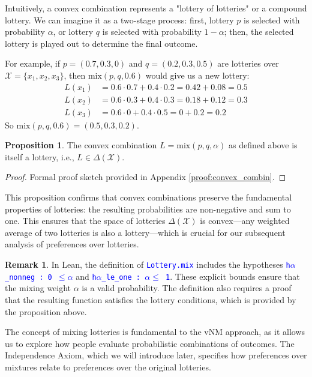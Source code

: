\documentclass{article}
\theoremstyle{definition}
\newtheorem{proposition}[definition]{Proposition}
\newtheorem{remark}{Remark}[section]
\newcommand{\X}{\mathcal{X}}
\newcommand{\tactic}[1]{\textcolor{blue}{\texttt{#1}}}
\newcommand{\DeltaX}{\Delta(\X)} %
\newcommand{\mix}{\mathrm{mix}} %
\begin{document}
Intuitively, a convex combination represents a "lottery of lotteries" or a compound lottery. We can imagine it as a two-stage process: first, lottery $p$ is selected with probability $\alpha$, or lottery $q$ is selected with probability $1-\alpha$; then, the selected lottery is played out to determine the final outcome.

For example, if $p=(0.7,0.3,0)$ and $q=(0.2,0.3,0.5)$ are lotteries over $\X=\{x_1,x_2,x_3\}$, then $\mix(p,q,0.6)$ would give us a new lottery:
\begin{align*}
L(x_1) &= 0.6 \cdot 0.7 + 0.4 \cdot 0.2 = 0.42 + 0.08 = 0.5\\ L(x_2) &= 0.6 \cdot 0.3 + 0.4 \cdot 0.3 = 0.18 + 0.12 = 0.3\\ L(x_3) &= 0.6 \cdot 0 + 0.4 \cdot 0.5 = 0 + 0.2 = 0.2
\end{align*}
So $\mix(p,q,0.6)=(0.5,0.3,0.2)$.

\begin{proposition}\label{convex_combin}
The convex combination $L = \mix(p, q, \alpha)$ as defined above is itself a lottery, i.e., $L \in \DeltaX$.
\end{proposition}
\begin{proof}
Formal proof sketch provided in Appendix \ref{proof:convex_combin}.
\end{proof}

This proposition confirms that convex combinations preserve the fundamental properties of lotteries: the resulting probabilities are non-negative and sum to one. This ensures that the space of lotteries $\DeltaX$ is convex—any weighted average of two lotteries is also a lottery—which is crucial for our subsequent analysis of preferences over lotteries.

\begin{remark}
In Lean, the definition of \tactic{Lottery.mix} includes the hypotheses \tactic{h$\alpha$\_nonneg : 0 $\leq\alpha$} and \tactic{h$\alpha$\_le\_one : $\alpha\leq$ 1}. These explicit bounds ensure that the mixing weight $\alpha$ is a valid probability. The definition also requires a proof that the resulting function satisfies the lottery conditions, which is provided by the proposition above.
\end{remark}

The concept of mixing lotteries is fundamental to the vNM approach, as it allows us to explore how people evaluate probabilistic combinations of outcomes. The Independence Axiom, which we will introduce later, specifies how preferences over mixtures relate to preferences over the original lotteries.
\end{document}
